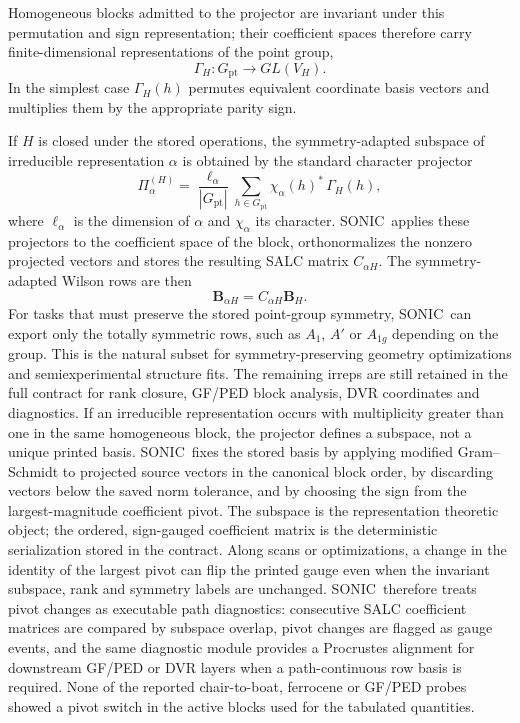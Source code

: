 \documentclass[journal=jctcce,manuscript=article,layout=traditional]{achemso}
\newcommand{\SONIC}{SONIC}
\newcommand{\Bmat}{\mathbf{B}}
\theoremstyle{definition}
\begin{document}
Homogeneous blocks admitted to the projector are invariant under this
permutation and sign representation; their coefficient spaces therefore carry
finite-dimensional representations of the point group,
\[
  \Gamma_H:G_{\mathrm{pt}}\rightarrow GL(V_H).
\]
In the simplest case \(\Gamma_H(h)\) permutes equivalent coordinate basis
vectors and multiplies them by the appropriate parity sign.

If \(H\) is closed under the stored operations, the symmetry-adapted subspace of
irreducible representation \(\alpha\) is obtained by the standard character
projector
\begin{equation}
  \Pi_{\alpha}^{(H)}
  =
  \frac{\ell_\alpha}{|G_{\mathrm{pt}}|}
  \sum_{h\in G_{\mathrm{pt}}}
  \chi_\alpha(h)^*\,\Gamma_H(h),
\end{equation}
where \(\ell_\alpha\) is the dimension of \(\alpha\) and
\(\chi_\alpha\) its character.  \SONIC\ applies these projectors to the coefficient
space of the block, orthonormalizes the nonzero projected vectors and stores the
resulting SALC matrix \(C_{\alpha H}\).  The symmetry-adapted Wilson rows are
then
\[
  \Bmat_{\alpha H}=C_{\alpha H}\Bmat_H .
\]
For tasks that must preserve the stored point-group symmetry, \SONIC\ can export
only the totally symmetric rows, such as \(A_1\), \(A'\) or \(A_{1g}\)
depending on the group.  This is the natural subset for symmetry-preserving
geometry optimizations and semiexperimental structure fits.  The remaining
irreps are still retained in the full contract for rank closure, GF/PED block
analysis, DVR coordinates and diagnostics.
If an irreducible representation occurs with multiplicity greater than one in
the same homogeneous block, the projector defines a subspace, not a unique
printed basis.  \SONIC\ fixes the stored basis by applying modified
Gram--Schmidt to projected source vectors in the canonical block order, by
discarding vectors below the saved norm tolerance, and by choosing the sign from
the largest-magnitude coefficient pivot.  The subspace is the representation
theoretic object; the ordered, sign-gauged coefficient matrix is the
deterministic serialization stored in the contract.
Along scans or optimizations, a change in the identity of the largest pivot can
flip the printed gauge even when the invariant subspace, rank and symmetry
labels are unchanged.  \SONIC\ therefore treats pivot changes as executable path
diagnostics: consecutive SALC coefficient matrices are compared by subspace
overlap, pivot changes are flagged as gauge events, and the same diagnostic
module provides a Procrustes alignment for downstream GF/PED or DVR layers
when a path-continuous row basis is required.  None of the reported
chair-to-boat, ferrocene or GF/PED probes showed a pivot switch in the active
blocks used for the tabulated quantities.
\end{document}
